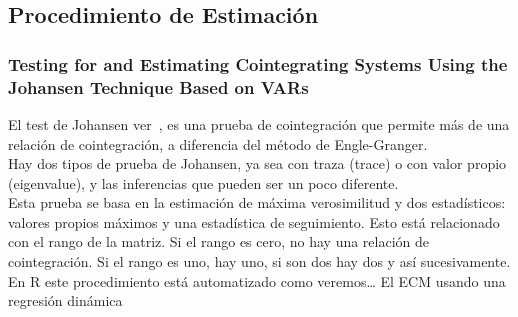 %
%
\pagebreak\subsection{Procedimiento de Estimaci\'on}
\subsubsection{Testing for and Estimating Cointegrating Systems Using the Johansen Technique Based on VARs}
El test de Johansen ver~\cite{johansen1988statistical},  es una prueba de cointegraci\'on que permite m\'as de una relaci\'on de cointegraci\'on, a diferencia del m\'etodo de Engle-Granger.\\
Hay dos tipos de prueba de Johansen, ya sea con traza (trace) o con valor propio (eigenvalue), y las inferencias que pueden ser un poco diferente.\\
Esta prueba se basa en la estimaci\'on de m\'axima verosimilitud y dos estad\'{i}sticos: valores propios m\'aximos y una estad\'{i}stica de seguimiento. Esto est\'a relacionado con el rango de la matriz. Si el rango es cero, no hay una relaci\'on de cointegraci\'on. Si el rango es uno, hay uno, si son dos hay dos y as\'{i} sucesivamente.\\
En R este procedimiento est\'a automatizado como veremos…
%
%
El ECM usando una regresi\'on din\'amica\\
\vspace{4mm}	
%
